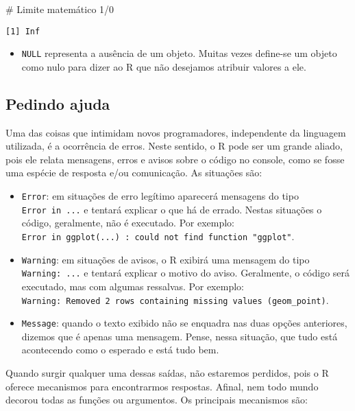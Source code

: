 \documentclass[
  12pt,
  letterpaper,
  DIV=11,
  numbers=noendperiod]{scrreprt}
\newenvironment{Shaded}{\begin{snugshade}}{\end{snugshade}}
\newcommand{\CommentTok}[1]{\textcolor[rgb]{0.37,0.37,0.37}{#1}}
\newcommand{\DecValTok}[1]{\textcolor[rgb]{0.68,0.00,0.00}{#1}}
\newcommand{\SpecialCharTok}[1]{\textcolor[rgb]{0.37,0.37,0.37}{#1}}
\providecommand{\tightlist}{%
  \setlength{\itemsep}{0pt}\setlength{\parskip}{0pt}}\usepackage{longtable,booktabs,array}
\begin{document}
\begin{Shaded}
\begin{Highlighting}[]
\CommentTok{\# Limite matemático}
\DecValTok{1}\SpecialCharTok{/}\DecValTok{0}
\end{Highlighting}
\end{Shaded}

\begin{verbatim}
[1] Inf
\end{verbatim}

\begin{itemize}
\tightlist
\item
  \texttt{NULL} representa a ausência de um objeto. Muitas vezes
  define-se um objeto como nulo para dizer ao R que não desejamos
  atribuir valores a ele.
\end{itemize}

\subsection{Pedindo ajuda}\label{pedindo-ajuda}

Uma das coisas que intimidam novos programadores, independente da
linguagem utilizada, é a ocorrência de erros. Neste sentido, o R pode
ser um grande aliado, pois ele relata mensagens, erros e avisos sobre o
código no console, como se fosse uma espécie de resposta e/ou
comunicação. As situações são:

\begin{itemize}
\tightlist
\item
  \texttt{Error}: em situações de erro legítimo aparecerá mensagens do
  tipo \texttt{Error\ in\ ...} e tentará explicar o que há de errado.
  Nestas situações o código, geralmente, não é executado. Por exemplo:
  \texttt{Error\ in\ ggplot(...)\ :\ could\ not\ find\ function\ "ggplot"}.
\item
  \texttt{Warning}: em situações de avisos, o R exibirá uma mensagem do
  tipo \texttt{Warning:\ ...} e tentará explicar o motivo do aviso.
  Geralmente, o código será executado, mas com algumas ressalvas. Por
  exemplo:
  \texttt{Warning:\ Removed\ 2\ rows\ containing\ missing\ values\ (geom\_point)}.
\item
  \texttt{Message}: quando o texto exibido não se enquadra nas duas
  opções anteriores, dizemos que é apenas uma mensagem. Pense, nessa
  situação, que tudo está acontecendo como o esperado e está tudo bem.
\end{itemize}

Quando surgir qualquer uma dessas saídas, não estaremos perdidos, pois o
R oferece mecanismos para encontrarmos respostas. Afinal, nem todo mundo
decorou todas as funções ou argumentos. Os principais mecanismos são:
\end{document}
